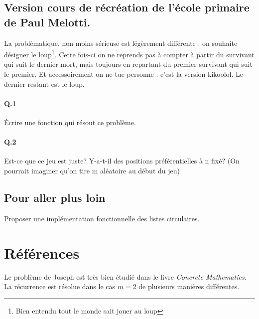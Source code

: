 \documentclass[10pt,a4paper]{article}
\begin{document}
\subsection{Version cours de récréation de l'école primaire de Paul Melotti.}
La problèmatique, non moins sérieuse est légèrement différente : on souhaite désigner le loup\footnote{Bien entendu tout le monde sait jouer au loup}.
Cette fois-ci on ne reprends pas à compter à partir du survivant qui suit le dernier mort, mais toujours en repartant du premier survivant qui suit le premier.
Et accessoirement on ne tue personne : c'est la version kikoolol. Le dernier restant est le loup.
\paragraph{Q.1} Écrire une fonction qui résout ce problème.
\paragraph{Q.2} Est-ce que ce jeu est juste? Y-a-t-il des positions préférentielles à n fixé? (On pourrait imaginer qu'on tire m aléatoire au début du jeu)
\subsection{Pour aller plus loin}
Proposer une implémentation fonctionnelle des listes circulaires.
\section{Références}
Le problème de Joseph est très bien étudié dans le livre \emph{Concrete Mathematics}. La récurrence est résolue dans le cas $m=2$ de plusieurs manières différentes.
\end{document}
